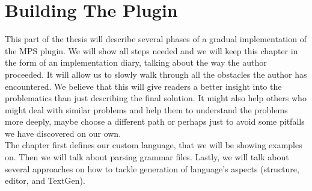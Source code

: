 \chapter{Building The Plugin}
\label{chap:importing_the_grammar}

This part of the thesis will describe several phases of a gradual implementation of the MPS plugin.
We will show all steps needed and we will keep this chapter in the form of an implementation diary, talking about the way the author proceeded.
It will allow us to slowly walk through all the obstacles the author has encountered.
We believe that this will give readers a better insight into the problematics than just describing the final solution.
It might also help others who might deal with similar problems and help them to understand the problems more deeply, maybe choose a different path or perhaps just to avoid some pitfalls we have discovered on our own.
\\

The chapter first defines our custom language, that we will be showing examples on.
Then we will talk about parsing grammar files.
Lastly, we will talk about several approaches on how to tackle generation of language's aspects (structure, editor, and TextGen).



\newpage



\newpage



\newpage



\newpage



\newpage


